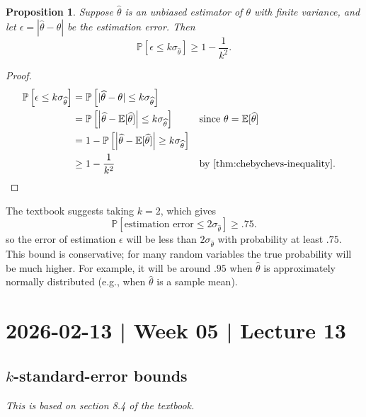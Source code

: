\documentclass[10pt]{article}
\newtheorem{proposition}[theorem]{Proposition}
\theoremstyle{definition}
\newcommand{\1}[1]{\textbf{1}_{\left[#1\right]}} %
\def\E{\mathbb{E}} %
\def\P{\mathbb{P}} %
\begin{document}
\begin{proposition}
  Suppose $\widehat{\theta}$ is an unbiased estimator of $\theta$ with finite
  variance, and let $\epsilon=|\widehat{\theta}-\theta|$ be the estimation
  error. Then
  \begin{equation*}
    \P\left[  \epsilon  \leq k\sigma_{\widehat{\theta}}\right] \geq 1-\frac{1}{k^{2}}.
  \end{equation*}
\end{proposition}
\begin{proof}
  \begin{align*}
    \P\left[ \epsilon \leq k\sigma_{\widehat{\theta}}\right] 
    &=\P\left[ | \widehat{\theta}-\theta | \leq k\sigma_{\widehat{\theta}}\right] \\
    &=\P\left[ \left| \widehat{\theta}- \E[\widehat{\theta} ] \right| \leq
      k\sigma_{\widehat{\theta}}\right]  &&\text{since $\theta= \E[\widehat{\theta} ]$}\\
    &= 1- \P\left[ \left| \widehat{\theta}- \E[\widehat{\theta} ] \right| \geq k\sigma_{\widehat{\theta}}\right]\\
    &\geq 1-\frac{1}{k^{2}} &&\text{by \cref{thm:chebychevs-inequality}.}
  \end{align*}
\end{proof}
The textbook suggests taking $k=2$, which gives
\begin{equation}\label{eq:two-standard-error-lower-bound}
  \P\left[ \text{estimation error} \leq 2\sigma_{\widehat{\theta}}\right] \geq .75.
\end{equation}
so the error of estimation $\epsilon$ will be less than
$2\sigma_{\widehat{\theta}}$ with probability at least $.75$. This bound is
conservative; for many random variables the true probability will be much
higher. For example, it will be around $.95$ when $\widehat{\theta}$ is
approximately normally distributed (e.g., when $\widehat{\theta}$ is a sample
mean).

\newpage
\section{2026-02-13 | Week 05 | Lecture 13}

\subsection{$k$-standard-error bounds}
\textit{This is based on section 8.4 of the textbook.}
\end{document}
